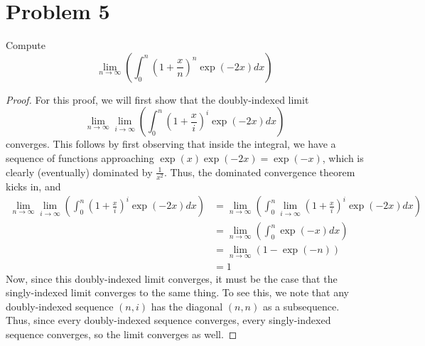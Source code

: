 \documentclass[fontsize=11pt]{scrartcl} %
\numberwithin{equation}{section} %
\numberwithin{figure}{section} %
\numberwithin{table}{section} %
\theoremstyle{definition}
\begin{document}
\section*{Problem 5}
Compute
\[
\lim_{n\to\infty}\left(\int_0^n (1+\frac{x}{n})^n\exp(-2x)dx\right)
\]

\begin{proof}
For this proof, we will first show that the doubly-indexed limit
\[
\lim_{n\to\infty}\lim_{i\to\infty}\left(\int_0^n (1+\frac{x}{i})^i\exp(-2x)dx\right)
\]
converges. This follows by first observing that inside the integral, we have
a sequence of functions approaching $\exp(x)\exp(-2x)=\exp(-x)$, which is clearly (eventually)
dominated by $\frac{1}{x^2}$. Thus, the dominated convergence theorem kicks in, and
\[
\begin{aligned}
\lim_{n\to\infty}\lim_{i\to\infty}\left(\int_0^n (1+\frac{x}{i})^i\exp(-2x)dx\right) &=
\lim_{n\to\infty}\left(\int_0^n \lim_{i\to\infty}(1+\frac{x}{i})^i\exp(-2x)dx\right)\\
                &= \lim_{n\to\infty}\left(\int_0^n\exp(-x)dx\right)\\
                &=\lim_{n\to\infty}(1-\exp(-n))\\
                &= 1
\end{aligned}
\]
Now, since this doubly-indexed limit converges, it must be the case that the singly-indexed
limit converges to the same thing. To see this, we note that any doubly-indexed sequence
$(n,i)$ has the diagonal $(n,n)$ as a subsequence. Thus, since every doubly-indexed sequence
converges, every singly-indexed sequence converges, so the limit converges as well.
\end{proof}
\newpage
\end{document}
